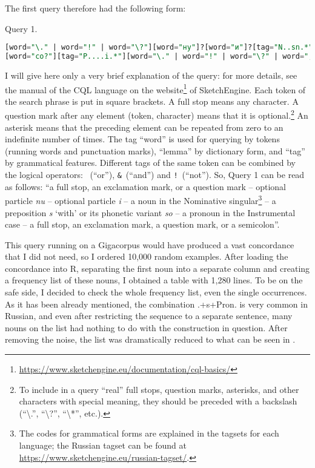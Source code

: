 \documentclass[output=paper]{langscibook}
\begin{document}
The first query therefore had the following form:

\ea
Query 1.
\begin{lstlisting}[language=SQL,breaklines=true]
[word="\." | word="!" | word="\?"][word="ну"]?[word="и"]?[tag="N..sn.*"]
[word="со?"][tag="P....i.*"][word="\." | word="!" | word="\?" | word=";"]
\end{lstlisting}
\z

I will give here only a very brief explanation of the query: for more details, see the manual of the CQL language on the website\footnote{\url{https://www.sketchengine.eu/documentation/cql-basics/}} of SketchEngine. Each token of the search phrase is put in square brackets. A full stop means any character. A question mark after any element (token, character) means that it is optional.\footnote{To include in a query “real” full stops, question marks, asterisks, and other characters with special meaning, they should be preceded with a backslash (“{\textbackslash}.”, “{\textbackslash}?”, “{\textbackslash}*”, etc.).} An asterisk means that the preceding element can be repeated from zero to an indefinite number of times. The tag “word” is used for querying by tokens (running words and punctuation marks), “lemma” by dictionary form, and “tag” by grammatical features. Different tags of the same token can be combined by the logical operators: \texttt{\textbar}~(“or”), \texttt{\&}~(“and”) and \texttt{!}~(“not”). So, Query 1 can be read as follows: “a full stop, an exclamation mark, or a question mark – optional particle \textit{nu} – optional particle \textit{i} – a noun in the Nominative singular\footnote{The codes for grammatical forms are explained in the tagsets for each language; the Russian tagset can be found at \url{https://www.sketchengine.eu/russian-tagset/}.} – a preposition \textit{s} ‘with’ or its phonetic variant \textit{so} – a pronoun in the Instrumental case – a full stop, an exclamation mark, a question mark, or a semicolon”.

This query running on a Gigacorpus would have produced a vast concordance that I did not need, so I ordered 10,000 random examples. After loading the concordance into R, separating the first noun into a separate column and creating a frequency list of these nouns, I obtained a table with 1,280 lines. To be on the safe side, I decided to check the whole frequency list, even the single occurrences. As it has been already mentioned, the combination {\glossN}.{\NOM}+s+Pron.{\INSTR} is very common in Russian, and even after restricting the sequence to a separate sentence, many nouns on the list had nothing to do with the construction in question. After removing the noise, the list was dramatically reduced to what can be seen in .
\end{document}
